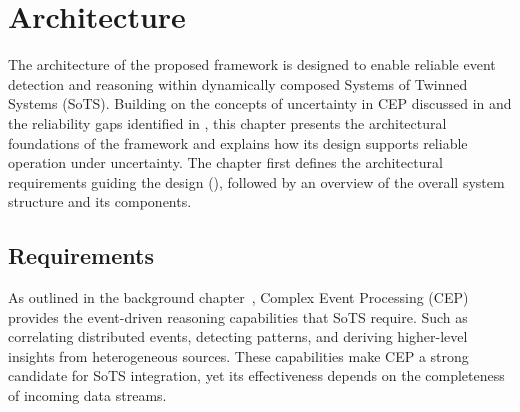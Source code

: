 \chapter{Architecture}\label{ch:architecture}











The architecture of the proposed framework is designed to enable reliable event detection and reasoning within dynamically composed Systems of Twinned Systems (SoTS).  
Building on the concepts of uncertainty in CEP discussed in  and the reliability gaps identified in , this chapter presents the architectural foundations of the framework and explains how its design supports reliable operation under uncertainty.
The chapter first defines the architectural requirements guiding the design (), followed by an overview of the overall system structure and its components.

\section{Requirements}\label{sec:arch-reqs}

As outlined in the background chapter~, Complex Event Processing (CEP) provides the event-driven reasoning capabilities that SoTS require. Such as correlating distributed events, detecting patterns, and deriving higher-level insights from heterogeneous sources. These capabilities make CEP a strong candidate for SoTS integration, yet its effectiveness depends on the completeness of incoming data streams.


